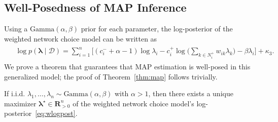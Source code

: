 \subsection{Well-Posedness of MAP Inference}

Using a $\text{Gamma}(\alpha, \beta)$ prior for each parameter, the log-posterior of the weighted network choice model can be written as
\begin{align}
\label{eq:wlogpost}
\begin{aligned}
&\log p(\bm{\lambda} \mid \mathcal{D}) =
    \sum_{i = 1}^n \bigg[ (c^-_i + \alpha - 1) \log \lambda_i
        - c^+_i \log \bigg( \sum_{k \in N^+_i} w_{ik} \lambda_k \bigg)  - \beta \lambda_i \bigg]
    + \kappa_3.
\end{aligned}
\end{align}
We prove a theorem that guarantees that MAP estimation is well-posed in this generalized model; the proof of Theorem~\ref{thm:map} follows trivially.

\begin{theorem}
\label{thm:wmap}
If i.i.d. $\lambda_1, \ldots, \lambda_n \sim \text{Gamma}(\alpha, \beta)$ with $\alpha > 1$, then there exists a unique maximizer $\bm{\lambda}^\star \in \mathbf{R}^n_{>0}$ of the weighted network choice model's log-posterior~\eqref{eq:wlogpost}.
\end{theorem}

